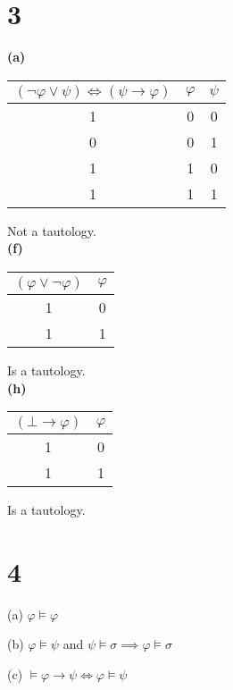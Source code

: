 \documentclass[10pt]{article}
\begin{document}

\section*{3}

\textbf{(a)}

\begin{tabular}{ c || c | c }			
  $(\lnot \varphi \lor \psi) \iff (\psi \to \varphi)$ & $\varphi$ & $\psi$ \\
  \hline
  1 & 0 & 0 \\
  0 & 0 & 1 \\
  1 & 1 & 0 \\
  1 & 1 & 1 \\
  \hline  
\end{tabular}
Not a tautology.\\


\noindent \textbf{(f)}

\begin{tabular}{ c || c }			
  $(\varphi \lor \lnot \varphi)$ & $\varphi$ \\
  \hline
  1 & 0 \\
  1 & 1 \\
  \hline  
\end{tabular}
Is a tautology.\\

\noindent \textbf{(h)}

\begin{tabular}{ c || c }			
  $(\bot \to \varphi)$ & $\varphi$ \\
  \hline
  1 & 0 \\
  1 & 1 \\
  \hline  
\end{tabular}
Is a tautology.


\section*{4}
\begin{description*}
  \item[(a)] $\varphi \models \varphi$


  \item[(b)] $\varphi \models \psi$ and $\psi \models \sigma \implies \varphi \models \sigma$

  \item[(c)] $\models \varphi \to \psi \iff \varphi \models \psi$


\end{description*}
\end{document}
